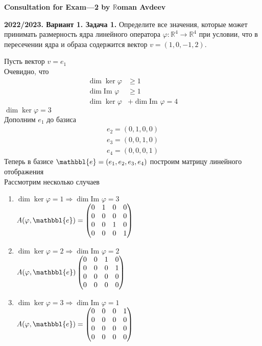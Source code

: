 \documentclass[a4paper]{article}
\newcommand{\e}{\mathbbl{e}}
\newcommand{\im}{\text{Im }}
\begin{document}
\begin{center}
    \LARGE{\textbf{Consultation for Exam—2 by $\mathbb{R}$oman Avdeev}}
\end{center}
\begin{tcolorbox}[colback=blue!20!white, colframe=black!100!black]
    \textbf{2022/2023. Вариант 1. Задача 1.} Определите все значения, которые может принимать размерность ядра линейного оператора $\varphi: \mathbb{R}^{4} \rightarrow \mathbb{R}^{4}$ при условии, что в пересечении ядра и образа содержится вектор $v=(1,0,-1,2)$.
\end{tcolorbox}
Пусть вектор $v=e_1$\\[2mm]
\indent Очевидно, что
$$\begin{aligned}
    \dim{\ker{\varphi}}&\geqslant1\\
    \dim{\im{\varphi}}&\geqslant1\\
    \dim{\ker{\varphi}}&+\dim{\im{\varphi}}=4
\end{aligned}$$
$\dim{\ker{\varphi}}=3$\\[2mm]
\indent Дополним $e_1$ до базиса $$\begin{aligned}
    e_2=(0,1,0,0)\\
    e_3=(0,0,1,0)\\
    e_4=(0,0,0,1)
\end{aligned}$$
Теперь в базисе $\e=(e_1,e_2,e_3,e_4)$ построим матрицу линейного отображения\\[2mm]
Рассмотрим несколько случаев
\begin{enumerate}
    \item $\dim{\ker{\varphi}}=1\Rightarrow\dim{\im{\varphi}}=3$\\[2mm]
    $A(\varphi,\e)=\begin{pmatrix}
    0&1&0&0\\
    0&0&0&0\\
    0&0&1&0\\
    0&0&0&1
\end{pmatrix}$
\item $\dim{\ker{\varphi}}=2\Rightarrow\dim{\im{\varphi}}=2$\\[2mm]
    $A(\varphi,\e)\begin{pmatrix}
    0&0&1&0\\
    0&0&0&1\\
    0&0&0&0\\
    0&0&0&0
\end{pmatrix}$
\item $\dim{\ker{\varphi}}=3\Rightarrow\dim{\im{\varphi}}=1$\\[2mm]
$A(\varphi,\e)=\begin{pmatrix}
    0&0&0&1\\
    0&0&0&0\\
    0&0&0&0\\
    0&0&0&0
\end{pmatrix}$
\end{enumerate}
\newpage
\end{document}

